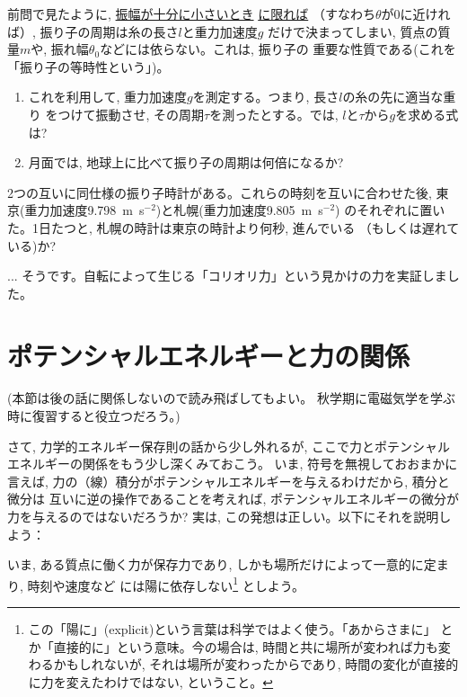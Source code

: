 \begin{q}\label{q:furiko_period}
前問で見たように, \underline{振幅が十分に小さいとき} \underline{に限れば}
（すなわち$\theta$が0に近ければ）, 振り子の周期は糸の長さ$l$と重力加速度$g$
だけで決まってしまい, 質点の質量$m$や, 振れ幅$\theta_0$などには依らない。これは, 振り子の
重要な性質である(これを「振り子の等時性という」)。
\begin{enumerate}
\item これを利用して, 重力加速度$g$を測定する。つまり, 長さ$l$の糸の先に適当な重り
をつけて振動させ, その周期$\tau$を測ったとする。では, $l$と$\tau$から$g$を求める式は? 
\item 月面では, 地球上に比べて振り子の周期は何倍になるか? 
\end{enumerate}
\end{q}

\begin{q} 2つの互いに同仕様の振り子時計がある。これらの時刻を互いに合わせた後, 
東京(重力加速度9.798~m~s$^{-2}$)と札幌(重力加速度9.805~m~s$^{-2}$)
のそれぞれに置いた。1日たつと, 札幌の時計は東京の時計より何秒, 進んでいる
（もしくは遅れている)か?\end{q}
\mv

\begin{faq}{\small{} ... 
そうです。自転によって生じる「コリオリ力」という見かけの力を実証しました。}\end{faq}\mv
\hv

\section{ポテンシャルエネルギーと力の関係}

{\small (本節は後の話に関係しないので読み飛ばしてもよい。
秋学期に電磁気学を学ぶ時に復習すると役立つだろう。)\\}

さて, 力学的エネルギー保存則の話から少し外れるが, ここで力とポテンシャルエネルギーの関係をもう少し深くみておこう。
いま, 符号を無視しておおまかに言えば, 力の（線）積分がポテンシャルエネルギーを与えるわけだから, 積分と微分は
互いに逆の操作であることを考えれば, ポテンシャルエネルギーの微分が力を与えるのではないだろうか? 
実は, この発想は正しい。以下にそれを説明しよう：

いま, ある質点に働く力が保存力であり, しかも場所だけによって一意的に定まり, 時刻や速度など
には陽に依存しない\footnote{この「陽に」(explicit)という言葉は科学ではよく使う。「あからさまに」
とか「直接的に」という意味。今の場合は, 時間と共に場所が変われば力も変わるかもしれないが, 
それは場所が変わったからであり, 時間の変化が直接的に力を変えたわけではない, ということ。}
としよう。

